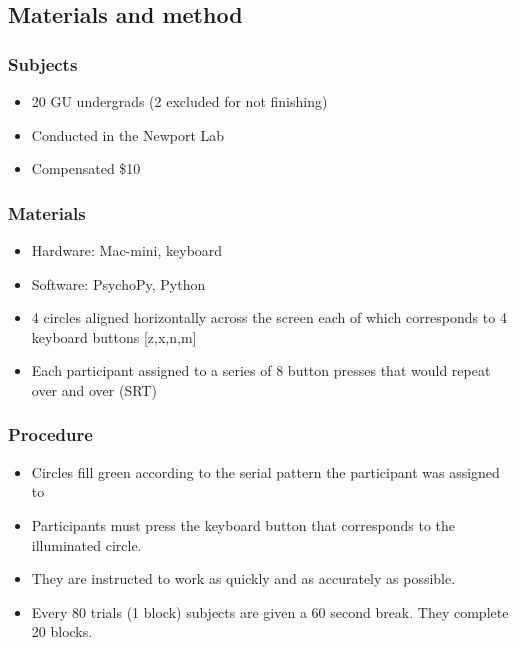\documentclass[11pt]{article}
\providecommand{\tightlist}{%
      \setlength{\itemsep}{0pt}\setlength{\parskip}{0pt}}
\begin{document}
    \subsection{Materials and method}\label{materials-and-method}

\subsubsection{Subjects}\label{subjects}

\begin{itemize}
\tightlist
\item
  20 GU undergrads (2 excluded for not finishing)
\item
  Conducted in the Newport Lab
\item
  Compensated \$10
\end{itemize}

    \subsubsection{Materials}\label{materials}

\begin{itemize}
\tightlist
\item
  Hardware: Mac-mini, keyboard
\item
  Software: PsychoPy, Python
\item
  4 circles aligned horizontally across the screen each of which
  corresponds to 4 keyboard buttons {[}z,x,n,m{]}
\item
  Each participant assigned to a series of 8 button presses that would
  repeat over and over (SRT)
\end{itemize}

    \subsubsection{Procedure}\label{procedure}

\begin{itemize}
\tightlist
\item
  Circles fill green according to the serial pattern the participant was
  assigned to
\item
  Participants must press the keyboard button that corresponds to the
  illuminated circle.
\item
  They are instructed to work as quickly and as accurately as possible.
\item
  Every 80 trials (1 block) subjects are given a 60 second break. They
  complete 20 blocks.
\end{itemize}
\end{document}
